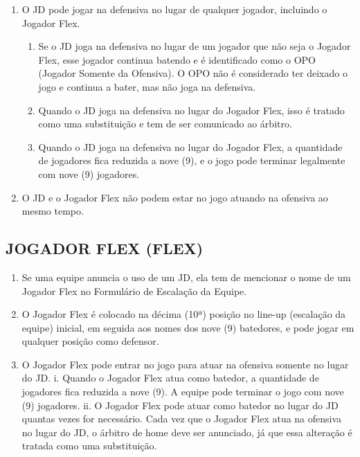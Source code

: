 \begin{multicols}{2}
\begin{enumerate}[label=\alph*)]
		\item  O JD pode jogar na defensiva no lugar de qualquer jogador, incluindo o Jogador Flex. 
		\begin{enumerate}[label=\roman* -]
			\item Se o JD joga na defensiva no lugar de um jogador que n\~ao seja o Jogador Flex, esse jogador continua batendo e \'e identificado como o \gls{OPO} (Jogador Somente da Ofensiva). O OPO n\~ao \'e considerado ter deixado o jogo e continua a bater, mas n\~ao joga na defensiva. 
			\item Quando o JD joga na defensiva no lugar do Jogador Flex, isso \'e tratado como uma substitui\c{c}\~ao e tem de ser comunicado ao \'arbitro. 
			\item Quando o JD joga na defensiva no lugar do Jogador Flex, a quantidade de jogadores fica reduzida a nove (9), e o jogo pode terminar legalmente com nove (9) jogadores. 
		\end{enumerate}
		\item  O JD e o Jogador Flex n\~ao podem estar no jogo atuando na ofensiva ao mesmo tempo. 
	\end{enumerate}
	
	\subsection{JOGADOR FLEX (FLEX) }
	
	\begin{enumerate}[label=\alph*)]
		\item Se uma equipe anuncia o uso de um JD, ela tem de mencionar o nome de um 
		Jogador Flex no Formul\'ario de Escala\c{c}\~ao da Equipe. 
		
		\item  O Jogador Flex \'e colocado na d\'ecima (10ª) posi\c{c}\~ao no \gls{line-up} (escala\c{c}\~ao da equipe) inicial, em seguida aos nomes dos nove (9) batedores, e pode jogar em 
		qualquer posi\c{c}\~ao como defensor. 
		
		\item  O Jogador Flex pode entrar no jogo para atuar na ofensiva somente no lugar do JD. 
		i. Quando o Jogador Flex atua como batedor, a quantidade de jogadores fica reduzida a 
		nove (9). A equipe pode terminar o jogo com nove (9) jogadores. 
		ii. O Jogador Flex pode atuar como batedor no lugar do JD quantas vezes for 
		necess\'ario. Cada vez que o Jogador Flex atua na ofensiva no lugar do JD, o \'arbitro de 
		\gls{home} deve ser anunciado, j\'a que essa altera\c{c}\~ao \'e tratada como uma substitui\c{c}\~ao. 
	\end{enumerate}

\end{multicols}
